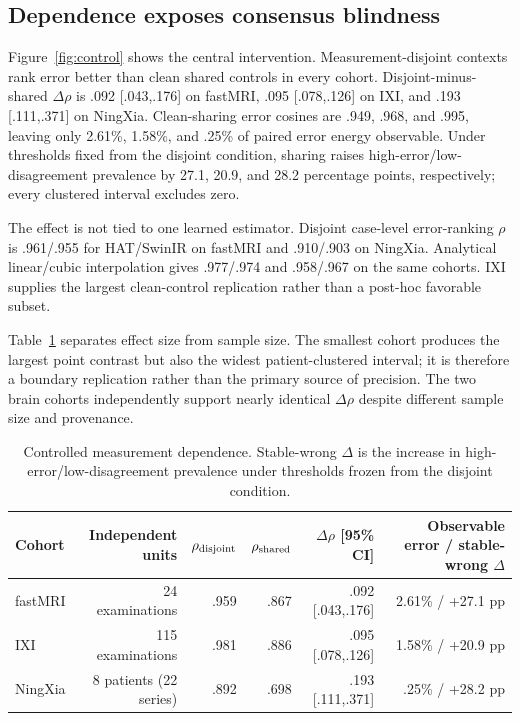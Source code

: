 \documentclass[10pt,twocolumn,letterpaper]{article}
\begin{document}
\subsection{Dependence exposes consensus blindness}
Figure~\ref{fig:control} shows the central intervention. Measurement-disjoint contexts rank error better than clean shared controls in every cohort. Disjoint-minus-shared $\Delta\rho$ is .092 [.043,.176] on fastMRI, .095 [.078,.126] on IXI, and .193 [.111,.371] on NingXia. Clean-sharing error cosines are .949, .968, and .995, leaving only 2.61\%, 1.58\%, and .25\% of paired error energy observable. Under thresholds fixed from the disjoint condition, sharing raises high-error/low-disagreement prevalence by 27.1, 20.9, and 28.2 percentage points, respectively; every clustered interval excludes zero.

The effect is not tied to one learned estimator. Disjoint case-level error-ranking $\rho$ is .961/.955 for HAT/SwinIR on fastMRI and .910/.903 on NingXia. Analytical linear/cubic interpolation gives .977/.974 and .958/.967 on the same cohorts. IXI supplies the largest clean-control replication rather than a post-hoc favorable subset.

Table~\ref{tab:controlled} separates effect size from sample size. The smallest cohort produces the largest point contrast but also the widest patient-clustered interval; it is therefore a boundary replication rather than the primary source of precision. The two brain cohorts independently support nearly identical $\Delta\rho$ despite different sample size and provenance.

\begin{table}[t]
\centering
\caption{Controlled measurement dependence. Stable-wrong $\Delta$ is the increase in high-error/low-disagreement prevalence under thresholds frozen from the disjoint condition.}
\label{tab:controlled}
\setlength{\tabcolsep}{4pt}
\begin{tabular}{lrrrrr}
\toprule
Cohort & Independent units & $\rho_{\rm disjoint}$ & $\rho_{\rm shared}$ & $\Delta\rho$ [95\% CI] & Observable error / stable-wrong $\Delta$ \\
\midrule
fastMRI & 24 examinations & .959 & .867 & .092 [.043,.176] & 2.61\% / +27.1 pp \\
IXI & 115 examinations & .981 & .886 & .095 [.078,.126] & 1.58\% / +20.9 pp \\
NingXia & 8 patients (22 series) & .892 & .698 & .193 [.111,.371] & .25\% / +28.2 pp \\
\bottomrule
\end{tabular}
\end{table}
\end{document}
